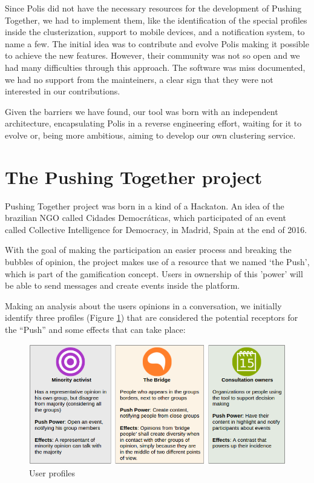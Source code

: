 \documentclass{llncs}
\begin{document}
  Since Polis did not have the necessary resources for the development of
  Pushing Together, we had to implement them, like the identification of
  the special profiles inside the clusterization, support to mobile devices, and a
  notification system, to name a few. The initial idea was to contribute and evolve Polis making it
  possible to achieve the new features. However, their community was not so
  open and we had many difficulties through this approach. The software was miss
  documented, we had no support from the mainteiners, a clear sign that they
  were not interested in our contributions.

  Given the barriers we have found, our tool was born with an independent
  architecture, encapsulating Polis in a reverse engineering effort, waiting
  for it to evolve or, being more ambitious, aiming to develop our own clustering
  service.

\section{The Pushing Together project}
\label{sec:pushingtogether}

  Pushing Together project was born in a kind of a Hackaton. An idea of the 
  brazilian NGO called Cidades Democráticas, which participated of an event
  called Collective Intelligence for Democracy, in Madrid, Spain at the end of
  2016.

  With the goal of making the participation an easier process and breaking the
  bubbles of opinion, the project makes use of a resource that we named ‘the Push’,
  which is part of the gamification concept. Users in ownership of this 'power'
  will be able to send messages and create events inside the platform.

  Making an analysis about the users opinions in a conversation, we initially
  identify three profiles (Figure \ref{fig:userprofiles}) that are considered the potential receptors for the “Push”
  and some effects that can take place: 

 \begin{figure}[H]
   \centering
     \includegraphics[keepaspectratio=true,scale=0.45]{images/userprofiles.png}
   \caption{User profiles}
   \label{fig:userprofiles}
 \end{figure}
\end{document}
